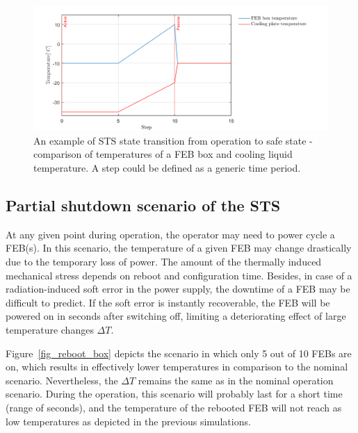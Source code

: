 \begin{figure}[!h]
\centering
\includegraphics[width=0.85\columnwidth]{Chapter4/images/nominal_all.png}
\caption{An example of \gls{STS} state transition from operation to safe state - comparison of temperatures of a \gls{FEB} box and cooling liquid temperature. A step could be defined as a generic time period.}
\label{fig_nominal_scenario}
\end{figure}


\subsection{Partial shutdown scenario of the STS}
\label{reboot}

At any given point during operation, the operator may need to power cycle a \gls{FEB}(s). In this scenario, the temperature of a given \gls{FEB} may change drastically due to the temporary loss of power. The amount of the thermally induced mechanical stress depends on reboot and configuration time. Besides, in case of a radiation-induced soft error in the power supply, the downtime of a \gls{FEB} may be difficult to predict. If the soft error is instantly recoverable, the FEB will be powered on in seconds after switching off, limiting a deteriorating effect of large temperature changes $\Delta T$.

Figure~\ref{fig_reboot_box} depicts the scenario in which only 5 out of 10 \glspl{FEB} are on, which results in effectively lower temperatures in comparison to the nominal scenario. Nevertheless, the $\Delta T$ remains the same as in the nominal operation scenario. During the operation, this scenario will probably last for a short time (range of seconds), and the temperature of the rebooted \gls{FEB} will not reach as low temperatures as depicted in the previous simulations.



